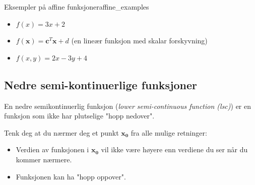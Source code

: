 \begin{example}{Eksempler på affine funksjoner}{affine_examples}
	\begin{itemize}
		\item $f(x) = 3x + 2$
		\item $f(\mathbf{x}) = \mathbf{c}^T\mathbf{x} + d$ (en lineær funksjon med skalar forskyvning)
		\item $f(x,y) = 2x - 3y + 4$
	\end{itemize}
\end{example}

\subsection{Nedre semi-kontinuerlige funksjoner}
En nedre semikontinuerlig funksjon (\emph{lower semi-continuous function (lsc)}) er en funksjon som ikke har plutselige "hopp nedover".

Tenk deg at du nærmer deg et punkt \( \symbf{x_0} \) fra alle mulige retninger:
\begin{itemize}
	\item Verdien av funksjonen i \( \symbf{x_0} \) vil ikke være høyere enn verdiene du ser når du kommer nærmere.
	\item Funksjonen kan ha "hopp oppover".
\end{itemize}

